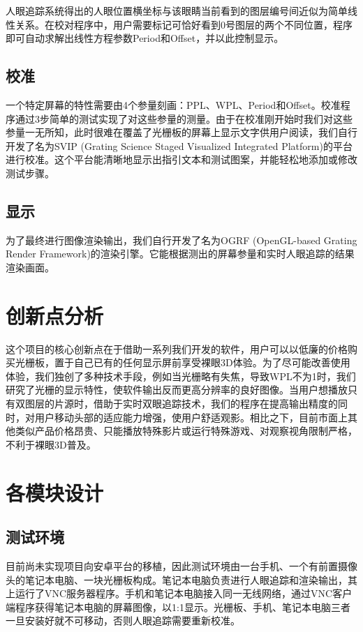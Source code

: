 \documentclass[12pt,a4paper]{article}
\begin{document}
人眼追踪系统得出的人眼位置横坐标与该眼睛当前看到的图层编号间近似为简单线性关系。在校对程序中，用户需要标记可恰好看到0号图层的两个不同位置，程序即可自动求解出线性方程参数Period和Offset，并以此控制显示。

\subsection{校准}

一个特定屏幕的特性需要由4个参量刻画：PPL、WPL、Period和Offset。校准程序通过3步简单的测试实现了对这些参量的测量。由于在校准刚开始时我们对这些参量一无所知，此时很难在覆盖了光栅板的屏幕上显示文字供用户阅读，我们自行开发了名为SVIP (Grating Science Staged Visualized Integrated Platform)的平台进行校准。这个平台能清晰地显示出指引文本和测试图案，并能轻松地添加或修改测试步骤。

\subsection{显示}

为了最终进行图像渲染输出，我们自行开发了名为OGRF (OpenGL-based Grating Render Framework)的渲染引擎。它能根据测出的屏幕参量和实时人眼追踪的结果渲染画面。

\section{创新点分析}

这个项目的核心创新点在于借助一系列我们开发的软件，用户可以以低廉的价格购买光栅板，置于自己已有的任何显示屏前享受裸眼3D体验。为了尽可能改善使用体验，我们独创了多种技术手段，例如当光栅略有失焦，导致WPL不为1时，我们研究了光栅的显示特性，使软件输出反而更高分辨率的良好图像。当用户想播放只有双图层的片源时，借助于实时双眼追踪技术，我们的程序在提高输出精度的同时，对用户移动头部的适应能力增强，使用户舒适观影。相比之下，目前市面上其他类似产品价格昂贵、只能播放特殊影片或运行特殊游戏、对观察视角限制严格，不利于裸眼3D普及。

\section{各模块设计}

\subsection{测试环境}

目前尚未实现项目向安卓平台的移植，因此测试环境由一台手机、一个有前置摄像头的笔记本电脑、一块光栅板构成。笔记本电脑负责进行人眼追踪和渲染输出，其上运行了VNC服务器程序。手机和笔记本电脑接入同一无线网络，通过VNC客户端程序获得笔记本电脑的屏幕图像，以1:1显示。光栅板、手机、笔记本电脑三者一旦安装好就不可移动，否则人眼追踪需要重新校准。
\end{document}

